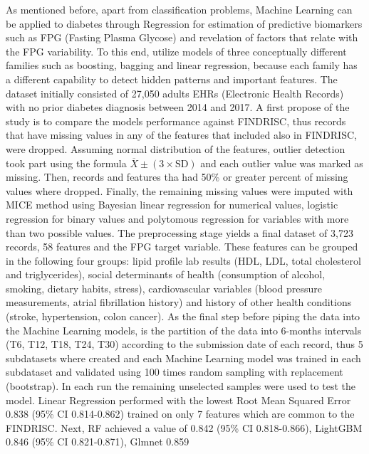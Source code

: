 \documentclass[journal,article,submit,pdftex,moreauthors]{Definitions/mdpi}
\begin{document}
\par As mentioned before, apart from classification problems, Machine Learning
can be applied to diabetes through Regression for estimation of predictive
biomarkers such as FPG (Fasting Plasma Glycose) and revelation of factors that
relate with the FPG variability. To this end, \cite{kopitar2020early} utilize
models of three conceptually different families such as boosting, bagging and
linear regression, because each family has a different capability to detect 
hidden patterns and important features. The dataset initially consisted of 
27,050 adults EHRs (Electronic Health Records) with no prior diabetes diagnosis
between 2014 and 2017. A first propose of the study is to compare the models
performance against FINDRISC, thus records that have missing values in any of
the features that included also in FINDRISC, were dropped. Assuming normal
distribution of the features, outlier detection took part using the formula
$\overline{X} \pm(3 \times \textrm{SD})$ and each outlier value was marked as
missing. Then, records and features tha had 50\% or greater percent of missing
values where dropped. Finally, the remaining missing values were imputed with
MICE method using Bayesian linear regression for numerical values, logistic   
regression for binary values and polytomous regression for variables with more
than two possible values. The preprocessing stage yields a final dataset of 3,723
records, 58 features and the FPG target variable. These features can be grouped
in the following four groups: lipid profile lab results (HDL, LDL, total 
cholesterol and triglycerides), social determinants of health (consumption of 
alcohol, smoking, dietary habits, stress), cardiovascular variables (blood 
pressure measurements, atrial fibrillation history) and history of other health
conditions (stroke, hypertension, colon cancer). As the final step before 
piping the data into the Machine Learning models, is the partition 
of the data into 6-months intervals (T6, T12, T18, T24, T30) 
according to the submission date of each record, thus 5 subdatasets where created
and each Machine Learning model was trained in each subdataset and validated using
100 times random sampling with replacement (bootstrap). In each run the remaining
unselected samples were used to test the model. Linear Regression performed with 
the lowest Root Mean Squared Error 0.838 (95\% CI 0.814-0.862) trained on only 7 
features which are common to the FINDRISC. Next, RF achieved a value of 0.842 
(95\% CI 0.818-0.866), LightGBM 0.846 (95\% CI 0.821-0.871), Glmnet 0.859 
\end{document}

